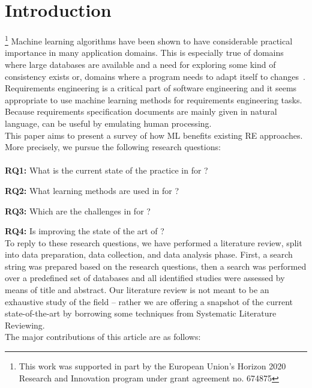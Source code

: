 \section{Introduction}

% 
% 
% 
% 
\footnote{This work was supported in part by the European Union’s Horizon 2020
Research and Innovation program under grant agreement no. 674875}
Machine learning algorithms have been shown to have considerable practical
importance in many application domains. This is especially true of domains where
large databases are available and a need for exploring some kind of consistency
exists or, domains where a program needs to adapt itself to
changes~\cite{Zhang2002}. Requirements engineering is a critical part of
software engineering and it seems appropriate to use machine learning methods
for requirements engineering tasks. Because requirements specification documents
are mainly given in natural language, \ML can be useful by emulating human
processing.
\\
This paper aims to present a survey of how ML benefits existing RE
approaches. More precisely, we pursue the following research questions: \\\\
\noindent
\textbf{RQ1:} What is the current state of the practice in \ML for \RE?

\noindent
\textbf{RQ2:} What learning methods are used in \ML for \RE?

\noindent
\textbf{RQ3:} Which are the challenges in \ML for \RE?

\noindent
\textbf{RQ4:} Is \ML improving the state of the art of \RE?\\

To reply to these research questions, we have performed a literature review,
split into data preparation, data collection, and data analysis phase. First, a search string
was prepared based on the research questions, then a search was performed over a
predefined set of databases and all identified studies were assessed by means of
title and abstract. Our literature review is not meant to be an exhaustive study
of the field -- rather we are offering a snapshot of the current
state-of-the-art by borrowing some techniques from Systematic Literature
Reviewing.\\
The major contributions of this article are as follows:

